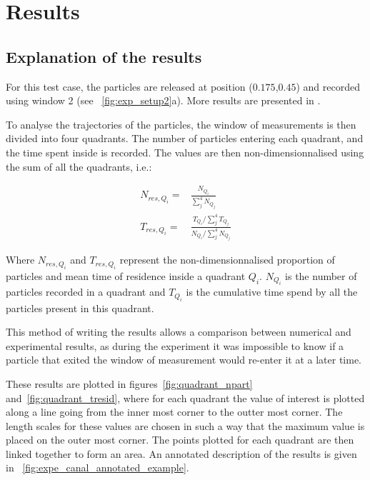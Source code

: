 %
%
%
\section{Results}

\subsection{Explanation of the results}

For this test case, the particles are released at position ($0.175$,$0.45$) and recorded using window 2
(see \figurename~\ref{fig:exp_setup2}a). More results are presented in \citet{Joly2011}.

To analyse the trajectories of the particles, the window of measurements is then divided into four quadrants.
The number of particles entering each quadrant, and the time spent inside is recorded. The values are then
non-dimensionnalised using the sum of all the quadrants, i.e.:

\begin{subequations}
\begin{align}
N_{res,Q_i}=&\frac{N_{Q_i}}{\sum_j^4{N_{Q_j}}}
\\
T_{res,Q_i}=&\frac{T_{Q_i}/\sum_j^4{T_{Q_j}}}{N_{Q_i}/\sum_j^4{N_{Q_j}}}
\end{align}
\end{subequations}

Where $N_{res,Q_i}$ and $T_{res,Q_i}$ represent the non-dimensionnalised proportion of particles and mean time
of residence inside a quadrant $Q_i$. $N_{Q_i}$ is the number of particles recorded in a quadrant and $T_{Q_i}$
is the cumulative time spend by all the particles present in this quadrant.

This method of writing the results allows a comparison between numerical and experimental results, as during the
experiment it was impossible to know if a particle that exited the window of measurement would re-enter it at a later time.

These results are plotted in figures~\ref{fig:quadrant_npart} and~\ref{fig:quadrant_tresid}, where for each quadrant the value
of interest is plotted along a line going from the inner most corner to the outter most corner. The length scales for these
values are chosen in such a way that the maximum value is placed on the outer most corner. The points plotted for each quadrant
are then linked together to form an area. An annotated description of the results is given in \figurename~\ref{fig:expe_canal_annotated_example}.

